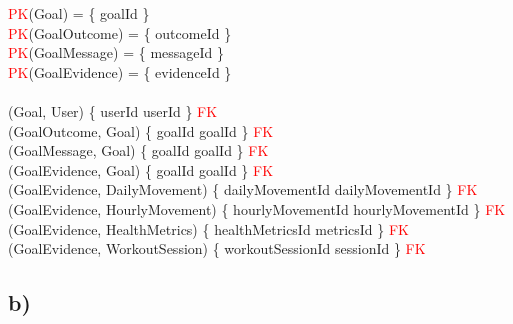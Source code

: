 \documentclass{article}
\begin{document}
\begin{zed}
\textcolor{red}{PK}(Goal) = \{ goalId \}  \\
\textcolor{red}{PK}(GoalOutcome) = \{ outcomeId \}  \\
\textcolor{red}{PK}(GoalMessage) = \{ messageId \}  \\
\textcolor{red}{PK}(GoalEvidence) = \{ evidenceId \}  \\
\newline \\ 
(Goal, User) \mapsto \{ userId \mapsto userId \} \in \textcolor{red}{FK} \\
(GoalOutcome, Goal) \mapsto \{ goalId \mapsto goalId \} \in \textcolor{red}{FK} \\
(GoalMessage, Goal) \mapsto \{ goalId \mapsto goalId \} \in \textcolor{red}{FK} \\
(GoalEvidence, Goal) \mapsto \{ goalId \mapsto goalId \} \in \textcolor{red}{FK} \\
(GoalEvidence, DailyMovement) \mapsto \{ dailyMovementId \mapsto dailyMovementId \} \in \textcolor{red}{FK} \\
(GoalEvidence, HourlyMovement) \mapsto \{ hourlyMovementId \mapsto hourlyMovementId \} \in \textcolor{red}{FK} \\
(GoalEvidence, HealthMetrics) \mapsto \{ healthMetricsId \mapsto metricsId \} \in \textcolor{red}{FK} \\
(GoalEvidence, WorkoutSession) \mapsto \{ workoutSessionId \mapsto sessionId \} \in \textcolor{red}{FK} \\
\end{zed}

\subsection*{\small b)}
\end{document}
